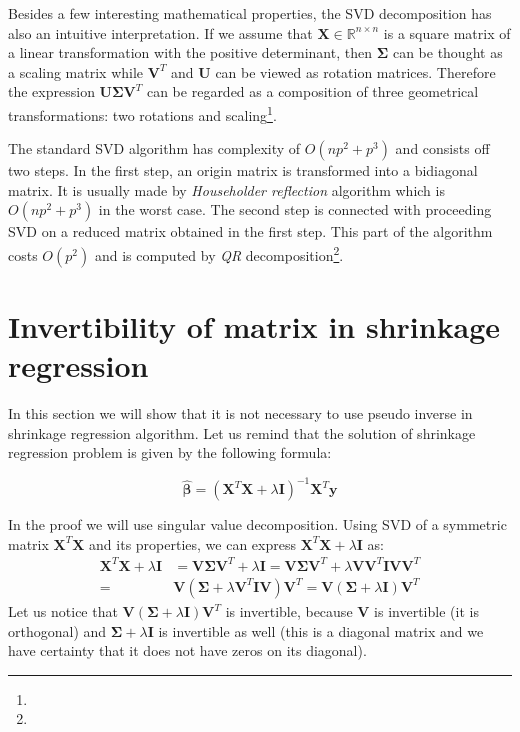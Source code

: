 \begin{appendices}
Besides a few interesting mathematical properties, the SVD decomposition has also an intuitive interpretation. If we assume that $\boldsymbol{X} \in \mathbb{R}^{n \times n}$ is a square matrix of a linear transformation with the positive determinant, then $\boldsymbol{\Sigma}$ can be thought as a scaling matrix while $\boldsymbol{V}^T$ and $\boldsymbol{U}$ can be viewed as rotation matrices. Therefore the expression $\boldsymbol{U}\boldsymbol{\Sigma}{\boldsymbol{V}^T}$ can be regarded as a composition of three geometrical transformations: two rotations and scaling\footnote{}.

The standard SVD algorithm has complexity of $O(np^2+p^3)$ and consists off two steps. In the first step, an origin matrix is transformed into a bidiagonal matrix. It is usually made by \textit{Householder reflection} algorithm which is $O(np^2+p^3)$ in the worst case. The second step is connected with proceeding SVD on a reduced matrix obtained in the first step. This part of the algorithm costs $O(p^2)$ and is computed by \textit{QR} decomposition\footnote{}. 

\newpage
\section{Invertibility of matrix in shrinkage regression}
\label{app:reg}

In this section we will show that it is not necessary to use pseudo inverse in shrinkage regression algorithm. Let us remind that the solution of shrinkage regression problem is given by the following formula:

\begin{equation}\label{eq:shrink}
    \boldsymbol{\hat{\beta}} = (\boldsymbol{X}^T\boldsymbol{X}+\lambda\boldsymbol{I})^{-1}\boldsymbol{X}^T\boldsymbol{y}
\end{equation}

In the proof we will use singular value decomposition. Using SVD of a symmetric matrix $\boldsymbol{X}^T\boldsymbol{X}$ and its properties, we can express $\boldsymbol{X}^T\boldsymbol{X}+\lambda\boldsymbol{I}$ as: 
\begin{equation}\label{eq:inv_proof}
\begin{split}
    \boldsymbol{X}^T\boldsymbol{X} + \lambda\boldsymbol{I}&=\boldsymbol{V}\boldsymbol{\Sigma}\boldsymbol{V}^T + \lambda\boldsymbol{I} = \boldsymbol{V}\boldsymbol{\Sigma}\boldsymbol{V}^T + \lambda\boldsymbol{V}\boldsymbol{V}^T\boldsymbol{I}\boldsymbol{V}\boldsymbol{V}^T \\ 
    = &\boldsymbol{V}(\boldsymbol{\Sigma} + \lambda\boldsymbol{V}^T\boldsymbol{I}\boldsymbol{V})\boldsymbol{V}^T = \boldsymbol{V}(\boldsymbol{\Sigma} + \lambda\boldsymbol{I})\boldsymbol{V}^T 
\end{split}
\end{equation}
Let us notice that $\boldsymbol{V}(\boldsymbol{\Sigma} + \lambda\boldsymbol{I})\boldsymbol{V}^T$ is invertible, because $\boldsymbol{V}$ is invertible (it is orthogonal) and $\boldsymbol{\Sigma} +\lambda\boldsymbol{I}$ is invertible as well (this is a diagonal matrix and we have certainty that it does not have zeros on its diagonal).


\end{appendices}
